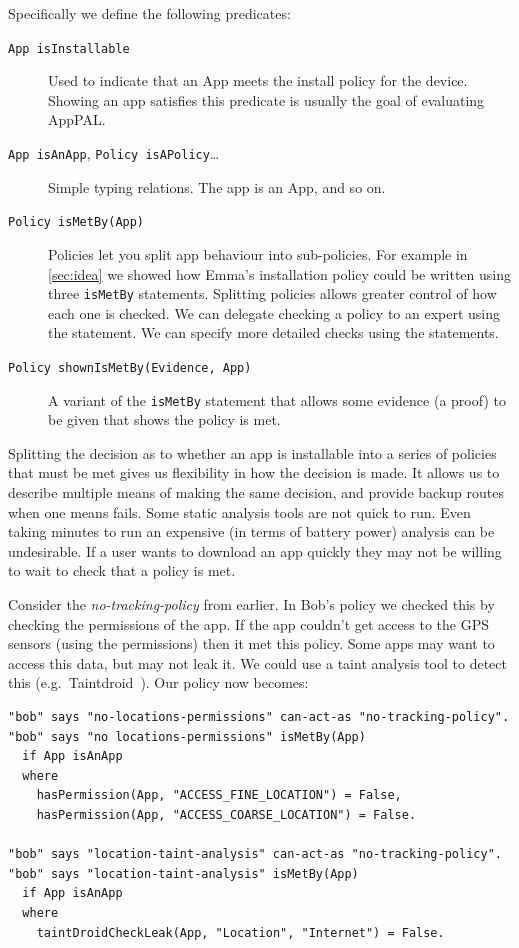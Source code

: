 \documentclass[a4paper]{scrartcl}
\begin{document}
Specifically we define the following predicates:
\begin{description}
  \item[\texttt{App isInstallable}]
    Used to indicate that an App meets the install policy for the device.
    Showing an app satisfies this predicate is usually the goal of evaluating AppPAL.

  \item[\texttt{App isAnApp}, \texttt{Policy isAPolicy}\ldots] 
    Simple typing relations.  
    The app  is an App, and so on.
  
  \item[\texttt{Policy isMetBy(App)}]
    Policies let you split app behaviour into sub-policies.
    For example in \autoref{sec:idea} we showed how Emma's installation policy could be written using three \texttt{isMetBy} statements.
    Splitting policies allows greater control of how each one is checked.
    We can delegate checking a policy to an expert using the  statement.
    We can specify more detailed checks using the  statements.

  \item[\texttt{Policy shownIsMetBy(Evidence, App)}]
    A variant of the \texttt{isMetBy} statement that allows some evidence (a proof) to be given that shows the policy is met.
\end{description}

Splitting the decision as to whether an app is installable into a series of policies that must be met gives us flexibility in how the decision is made.
It allows us to describe multiple means of making the same decision, and provide backup routes when one means fails.
Some static analysis tools are not quick to run.
Even taking minutes to run an expensive (in terms of battery power) analysis can be undesirable.
If a user wants to download an app quickly they may not be willing to wait to check that a policy is met.

Consider the \emph{no-tracking-policy} from earlier.
In Bob's policy we checked this by checking the permissions of the app.
If the app couldn't get access to the GPS sensors (using the permissions) then it met this policy.
Some apps may want to access this data, but may not leak it.
We could use a taint analysis tool to detect this (e.g.~Taintdroid~\citep{Fritz:2013vi}).
Our policy now becomes:

\begin{lstlisting}
"bob" says "no-locations-permissions" can-act-as "no-tracking-policy".
"bob" says "no locations-permissions" isMetBy(App)
  if App isAnApp
  where
    hasPermission(App, "ACCESS_FINE_LOCATION") = False,
    hasPermission(App, "ACCESS_COARSE_LOCATION") = False.

"bob" says "location-taint-analysis" can-act-as "no-tracking-policy".
"bob" says "location-taint-analysis" isMetBy(App)
  if App isAnApp
  where
    taintDroidCheckLeak(App, "Location", "Internet") = False.
\end{lstlisting}
\end{document}
